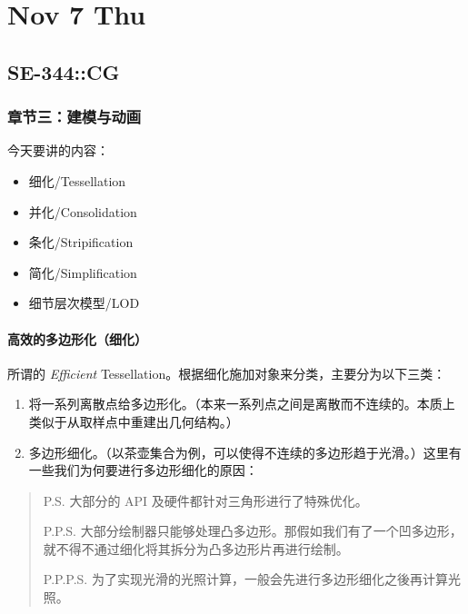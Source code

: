 \documentclass[
]{article}
\date{}
\begin{document}
\hypertarget{header-n0}{%
\section{Nov 7 Thu}\label{header-n0}}

\hypertarget{header-n2}{%
\subsection{SE-344::CG}\label{header-n2}}

\hypertarget{header-n3}{%
\subsubsection{章节三：建模与动画}\label{header-n3}}

今天要讲的内容：

\begin{itemize}
\item
  细化/Tessellation
\item
  并化/Consolidation
\item
  条化/Stripification
\item
  简化/Simplification
\item
  细节层次模型/LOD
\end{itemize}

\hypertarget{header-n16}{%
\paragraph{高效的多边形化（细化）}\label{header-n16}}

所谓的 \emph{Efficient}
Tessellation。根据细化施加对象来分类，主要分为以下三类：

\begin{enumerate}
\def\labelenumi{\arabic{enumi}.}
\item
  将一系列离散点给多边形化。（本来一系列点之间是离散而不连续的。本质上类似于从取样点中重建出几何结构。）
\item
  多边形细化。（以茶壶集合为例，可以使得不连续的多边形趋于光滑。）这里有一些我们为何要进行多边形细化的原因：
\end{enumerate}

\begin{quote}
P.S. 大部分的 API 及硬件都针对三角形进行了特殊优化。

P.P.S.
大部分绘制器只能够处理凸多边形。那假如我们有了一个凹多边形，就不得不通过细化将其拆分为凸多边形片再进行绘制。

P.P.P.S. 为了实现光滑的光照计算，一般会先进行多边形细化之後再计算光照。
\end{quote}
\end{document}

